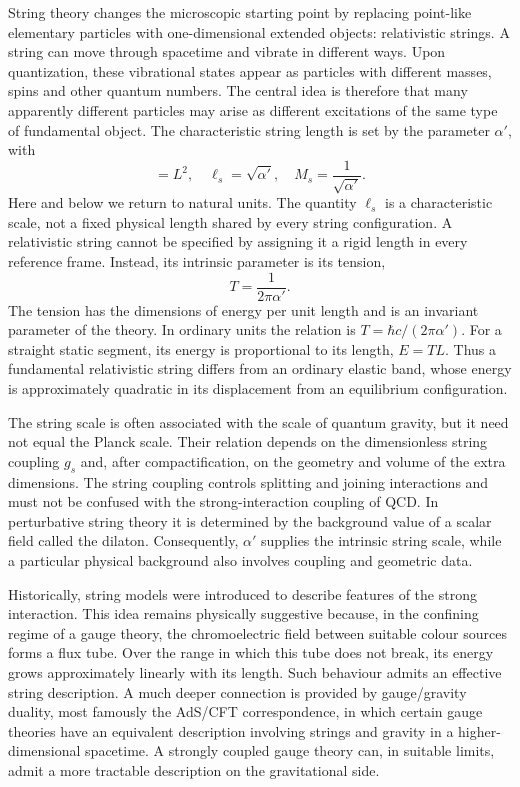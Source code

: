 String theory changes the microscopic starting point by replacing point-like elementary particles with one-dimensional extended objects: relativistic strings. A string can move through spacetime and vibrate in different ways. Upon quantization, these vibrational states appear as particles with different masses, spins and other quantum numbers. The central idea is therefore that many apparently different particles may arise as different excitations of the same type of fundamental object. The characteristic string length is set by the parameter $\alpha'$, with
\begin{equation}
    [\alpha'] = L^2,\quad \ell_s = \sqrt{\alpha'},\quad M_s = \frac{1}{\sqrt{\alpha'}}.
\end{equation}
Here and below we return to natural units. The quantity $\ell_s$ is a characteristic scale, not a fixed physical length shared by every string configuration. A relativistic string cannot be specified by assigning it a rigid length in every reference frame. Instead, its intrinsic parameter is its tension,
\begin{equation}
    T=\frac{1}{2\pi\alpha'}.
\end{equation}
The tension has the dimensions of energy per unit length and is an invariant parameter of the theory. In ordinary units the relation is $T=\hbar c/(2\pi\alpha')$. For a straight static segment, its energy is proportional to its length, $E=TL$. Thus a fundamental relativistic string differs from an ordinary elastic band, whose energy is approximately quadratic in its displacement from an equilibrium configuration.

The string scale is often associated with the scale of quantum gravity, but it need not equal the Planck scale. Their relation depends on the dimensionless string coupling $g_s$ and, after compactification, on the geometry and volume of the extra dimensions. The string coupling controls splitting and joining interactions and must not be confused with the strong-interaction coupling of QCD. In perturbative string theory it is determined by the background value of a scalar field called the dilaton. Consequently, $\alpha'$ supplies the intrinsic string scale, while a particular physical background also involves coupling and geometric data.

Historically, string models were introduced to describe features of the strong interaction. This idea remains physically suggestive because, in the confining regime of a gauge theory, the chromoelectric field between suitable colour sources forms a flux tube. Over the range in which this tube does not break, its energy grows approximately linearly with its length. Such behaviour admits an effective string description. A much deeper connection is provided by gauge/gravity duality, most famously the AdS/CFT correspondence, in which certain gauge theories have an equivalent description involving strings and gravity in a higher-dimensional spacetime. A strongly coupled gauge theory can, in suitable limits, admit a more tractable description on the gravitational side.

